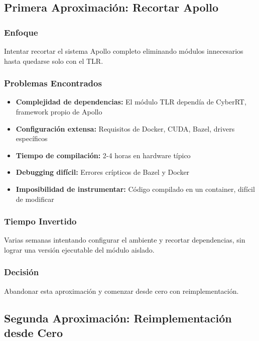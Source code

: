 \subsection{Primera Aproximación: Recortar Apollo}

\subsubsection{Enfoque}

Intentar recortar el sistema Apollo completo eliminando módulos innecesarios hasta quedarse solo con el TLR.

\subsubsection{Problemas Encontrados}

\begin{itemize}
    \item \textbf{Complejidad de dependencias:} El módulo TLR dependía de CyberRT, framework propio de Apollo
    \item \textbf{Configuración extensa:} Requisitos de Docker, CUDA, Bazel, drivers específicos
    \item \textbf{Tiempo de compilación:} 2-4 horas en hardware típico
    \item \textbf{Debugging difícil:} Errores crípticos de Bazel y Docker
    \item \textbf{Imposibilidad de instrumentar:} Código compilado en un container, difícil de modificar
\end{itemize}

\subsubsection{Tiempo Invertido}

Varias semanas intentando configurar el ambiente y recortar dependencias, sin lograr una versión ejecutable del módulo aislado.

\subsubsection{Decisión}

Abandonar esta aproximación y comenzar desde cero con reimplementación.

\subsection{Segunda Aproximación: Reimplementación desde Cero}


